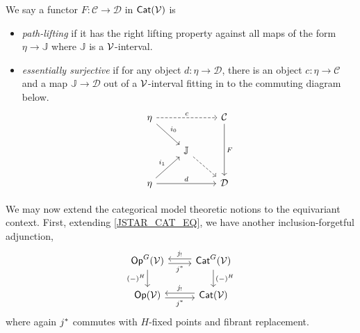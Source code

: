 \documentclass[a4paper,10pt
,draft
]{article}%
\newcommand{\J}{\mathbb J}
\renewcommand{\1}{\eta}%
\begin{document}
\begin{definition}
      \label{PL_ES_DEFN}
      We say a functor $F: \mathcal C \to \mathcal D$ in $\mathsf{Cat}(\mathcal V)$ is
      \begin{itemize} %
      \item \textit{path-lifting}
            if it has the right lifting property against all maps of the form
            $\1 \to \J$
            where $\J$ is a $\mathcal V$-interval.
      \item \textit{essentially surjective}
            if for any object $d: \1 \to \mathcal D$,
            there is an object $c: \1 \to \mathcal C$
            and a map $\J \to \mathcal D$ out of a $\mathcal V$-interval fitting in to the commuting diagram below.
            \begin{equation}
                  \label{ESSURJ_EQ}
                  \begin{tikzcd}
                        \1 \arrow[rr, dashed, "c"] \arrow[dr, "i_0"]
                        &&
                        \mathcal C \arrow[dd, "F"]
                        \\
                        &
                        \J \arrow[dr, dashed]
                        \\
                        \1 \arrow[ur, " i_1"] \arrow[rr,"d"]
                        &&
                        \mathcal D
                  \end{tikzcd}
            \end{equation}
      \end{itemize}
\end{definition}


We may now extend the categorical model theoretic notions to the equivariant context.
First, extending \eqref{JSTAR_CAT_EQ}, we have another inclusion-forgetful adjunction,      
\begin{equation}
      \label{JSTAR_EQ}
      \begin{tikzcd}
            \mathsf{Op}^G(\V) \arrow[d, "(-)^H"']
            \arrow[r, shift right, "j^*"']
            &
            \mathsf{Cat}^G(\V) \arrow[l, shift right, swap, "j_!"] \arrow[d, "(-)^H"]
            \\
            \Op(\V) \arrow[r, shift right, "j^*"']
            &
            \Cat(\V) \arrow[l, shift right, swap, "j_!"]
      \end{tikzcd}
\end{equation}
where again $j^{\**}$ commutes with $H$-fixed points and fibrant replacement.
\end{document}
